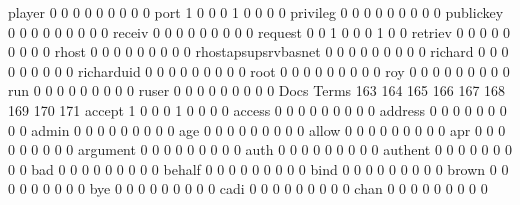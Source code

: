 \documentclass[compress,8pt]{beamer}
\begin{document}
\begin{frame}
\begin{Schunk}
  player                                     0   0   0   0   0   0   0   0   0
  port                                       1   0   0   0   1   0   0   0   0
  privileg                                   0   0   0   0   0   0   0   0   0
  publickey                                  0   0   0   0   0   0   0   0   0
  receiv                                     0   0   0   0   0   0   0   0   0
  request                                    0   0   1   0   0   0   1   0   0
  retriev                                    0   0   0   0   0   0   0   0   0
  rhost                                      0   0   0   0   0   0   0   0   0
  rhostapsupsrvbasnet                        0   0   0   0   0   0   0   0   0
  richard                                    0   0   0   0   0   0   0   0   0
  richarduid                                 0   0   0   0   0   0   0   0   0
  root                                       0   0   0   0   0   0   0   0   0
  roy                                        0   0   0   0   0   0   0   0   0
  run                                        0   0   0   0   0   0   0   0   0
  ruser                                      0   0   0   0   0   0   0   0   0
                                          Docs
Terms                                      163 164 165 166 167 168 169 170 171
  accept                                     1   0   0   0   1   0   0   0   0
  access                                     0   0   0   0   0   0   0   0   0
  address                                    0   0   0   0   0   0   0   0   0
  admin                                      0   0   0   0   0   0   0   0   0
  age                                        0   0   0   0   0   0   0   0   0
  allow                                      0   0   0   0   0   0   0   0   0
  apr                                        0   0   0   0   0   0   0   0   0
  argument                                   0   0   0   0   0   0   0   0   0
  auth                                       0   0   0   0   0   0   0   0   0
  authent                                    0   0   0   0   0   0   0   0   0
  bad                                        0   0   0   0   0   0   0   0   0
  behalf                                     0   0   0   0   0   0   0   0   0
  bind                                       0   0   0   0   0   0   0   0   0
  brown                                      0   0   0   0   0   0   0   0   0
  bye                                        0   0   0   0   0   0   0   0   0
  cadi                                       0   0   0   0   0   0   0   0   0
  chan                                       0   0   0   0   0   0   0   0   0

\end{Schunk}
\end{frame}
\end{document}
